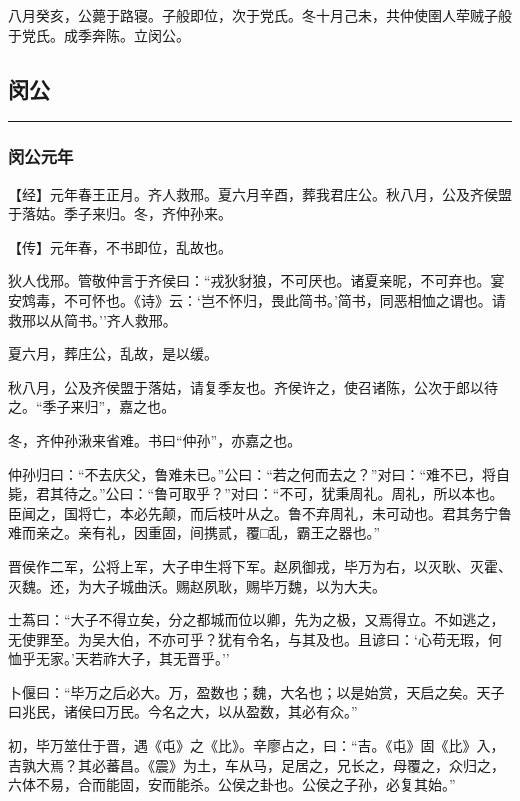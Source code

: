 \documentclass[]{article}
\begin{document}
八月癸亥，公薨于路寝。子般即位，次于党氏。冬十月己未，共仲使圉人荦贼子般于党氏。成季奔陈。立闵公。

\hypertarget{header-n610}{%
\subsection{闵公}\label{header-n610}}

\begin{center}\rule{0.5\linewidth}{\linethickness}\end{center}

\hypertarget{header-n612}{%
\subsubsection{闵公元年}\label{header-n612}}

【经】元年春王正月。齐人救邢。夏六月辛酉，葬我君庄公。秋八月，公及齐侯盟于落姑。季子来归。冬，齐仲孙来。

【传】元年春，不书即位，乱故也。

狄人伐邢。管敬仲言于齐侯曰：``戎狄豺狼，不可厌也。诸夏亲昵，不可弃也。宴安鸩毒，不可怀也。《诗》云：`岂不怀归，畏此简书。'简书，同恶相恤之谓也。请救邢以从简书。''齐人救邢。

夏六月，葬庄公，乱故，是以缓。

秋八月，公及齐侯盟于落姑，请复季友也。齐侯许之，使召诸陈，公次于郎以待之。``季子来归''，嘉之也。

冬，齐仲孙湫来省难。书曰``仲孙''，亦嘉之也。

仲孙归曰：``不去庆父，鲁难未已。''公曰：``若之何而去之？''对曰：``难不已，将自毙，君其待之。''公曰：``鲁可取乎？''对曰：``不可，犹秉周礼。周礼，所以本也。臣闻之，国将亡，本必先颠，而后枝叶从之。鲁不弃周礼，未可动也。君其务宁鲁难而亲之。亲有礼，因重固，间携贰，覆□乱，霸王之器也。''

晋侯作二军，公将上军，大子申生将下军。赵夙御戎，毕万为右，以灭耿、灭霍、灭魏。还，为大子城曲沃。赐赵夙耿，赐毕万魏，以为大夫。

士蒍曰：``大子不得立矣，分之都城而位以卿，先为之极，又焉得立。不如逃之，无使罪至。为吴大伯，不亦可乎？犹有令名，与其及也。且谚曰：`心苟无瑕，何恤乎无家。'天若祚大子，其无晋乎。''

卜偃曰：``毕万之后必大。万，盈数也；魏，大名也；以是始赏，天启之矣。天子曰兆民，诸侯曰万民。今名之大，以从盈数，其必有众。''

初，毕万筮仕于晋，遇《屯》之《比》。辛廖占之，曰：``吉。《屯》固《比》入，吉孰大焉？其必蕃昌。《震》为土，车从马，足居之，兄长之，母覆之，众归之，六体不易，合而能固，安而能杀。公侯之卦也。公侯之子孙，必复其始。''
\end{document}
